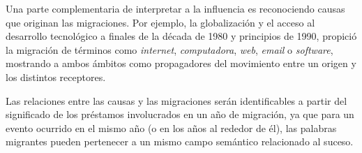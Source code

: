 

Una parte complementaria de interpretar a la influencia es reconociendo causas que originan las migraciones. Por ejemplo, la globalización y el acceso al desarrollo tecnológico a finales de la década de 1980 y principios de 1990, propició la migración  de términos como \textit{internet}, \textit{computadora}, \textit{web}, \textit{email} o \textit{software}, mostrando a ambos ámbitos como propagadores del movimiento entre un origen y los distintos receptores.

Las relaciones entre las causas y las migraciones serán identificables a partir  del significado de los préstamos involucrados en un año de migración,  ya que para un evento ocurrido en el mismo año (o en los años al rededor de él), las palabras migrantes pueden pertenecer a un mismo campo semántico relacionado al suceso.



















